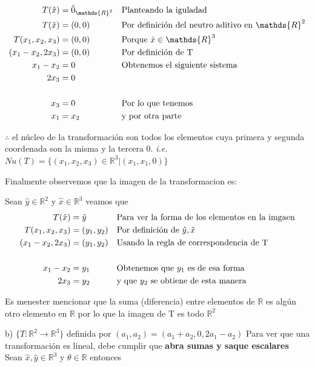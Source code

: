 \documentclass[letterpaper]{article}
\newcommand{\R}{\mathds{R}}
\renewcommand{\*}{\cdot}
\theoremstyle{definition}
\begin{document}
	\begin{align*}
		T(\hat{x}) &= \hat{0}_{\R^2} && \text{Planteando la iguladad}\\  
		T(\hat{x}) &= (0,0) && \text{Por definición del neutro aditivo en $ \R^2 $} \\  
		T(x_1, x_2, x_3) &= (0,0) && \text{Porque $ \hat{x} \in \R^3 $ } \\  
		(x_1 - x_2, 2x_3) &= (0,0) && \text{Por definición de T } \\  
		x_1 - x_2 &= 0 && \text{Obtenemos el siguiente sistema } \\  
		2x_3 &= 0 && \text{ } \\  
		\\
		x_3 &= 0 && \text{Por lo que tenemos } \\  
		x_1 &= x_2 && \text{y por otra parte } \\  
	\end{align*}
	\begin{center}
		$ \therefore $ el núcleo de la transformación son todos los elementos cuya primera y segunda coordenada son la misma y la tercera 0. \textit{i.e.}
		$ Nu(T) = \lbrace (x_1, x_2, x_3) \in \R^3 | (x_1,x_1, 0)\rbrace $
	\end{center}
	
	Finalmente observemos que la imagen de la transformacion es:
	
	Sean $ \hat{y} \in \R^2 $ y $ \hat{x} \in \R^3 $ veamos que 
	\begin{align*}
		T(\hat{x}) &= \hat{y} && \text{Para ver la forma de los elementos en la imgaen}\\
		T(x_1, x_2, x_3) &= (y_1, y_2) && \text{Por definición de $ \hat{y}, \hat{x} $}\\
		(x_1 - x_2, 2 x_3) &= (y_1, y_2) && \text{Usando la regla de correspondencia de T }\\
		\\
		x_1 - x_2  &= y_1 && \text{Obtenemos que $ y_1 $ es de esa forma }\\
		2x_3  &= y_2 && \text{y que $ y_2 $ se obtiene de esta manera}\\
	\end{align*}
	
	\begin{center}
		Es menester mencionar que la suma (diferencia) entre elementos de $ \R $ es algún otro elemento en $ \R $ por lo que la imagen de T es todo $ \R^2 $
	\end{center}

	
	b) $\lbrace T: \mathbb{R}^{2} \longrightarrow \mathbb{R}^{3} \rbrace$ definida por $(a_{1},a_{2}) = (a_{1} + a_{2}, 0, 2a_{1} - a_{2})$
	Para ver que una transformación es lineal, debe cumplir que \textbf{abra sumas y saque escalares}\\
	Sean $ \hat{x}, \hat{y} \in \R^3 $ y $ \theta \in \R $ entonces
	
\end{document}
